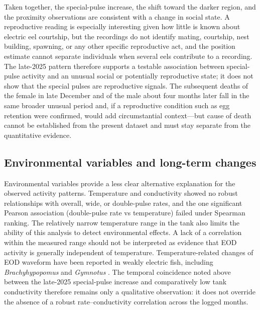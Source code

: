 Taken together, the special-pulse increase, the shift toward the darker region, and the proximity observations are consistent with a change in social state.
A reproductive reading is especially interesting given how little is known about electric eel courtship, but the recordings do not identify mating, courtship, nest building, spawning, or any other specific reproductive act, and the position estimate cannot separate individuals when several eels contribute to a recording.
The late-2025 pattern therefore supports a testable association between special-pulse activity and an unusual social or potentially reproductive state; it does not show that the special pulses are reproductive signals.
The subsequent deaths of the female in late December and of the male about four months later fall in the same broader unusual period and, if a reproductive condition such as egg retention were confirmed, would add circumstantial context---but cause of death cannot be established from the present dataset and must stay separate from the quantitative evidence.

\subsection{Environmental variables and long-term changes}

Environmental variables provide a less clear alternative explanation for the observed activity patterns. 
Temperature and conductivity showed no robust relationships with overall, wide, or double-pulse rates, and the one significant Pearson association (double-pulse rate vs temperature) failed under Spearman ranking.
The relatively narrow temperature range in the tank also limits the ability of this analysis to detect environmental effects. 
A lack of a correlation within the measured range should not be interpreted as evidence that EOD activity is generally independent of temperature. 
Temperature-related changes of EOD waveform have been reported in weakly electric fish, including \textit{Brachyhypopomus} and \textit{Gymnotus} \parencite{silva1999water, ardanaz2001temperature}.
The temporal coincidence noted above between the late-2025 special-pulse increase and comparatively low tank conductivity therefore remains only a qualitative observation: it does not override the absence of a robust rate--conductivity correlation across the logged months.


